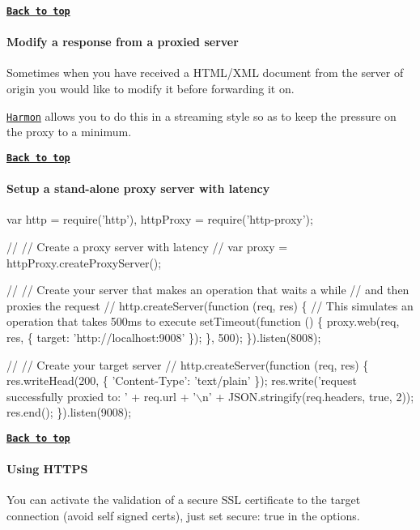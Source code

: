 {\bfseries \href{#table-of-contents}{\tt Back to top}}

\paragraph*{Modify a response from a proxied server}

Sometimes when you have received a H\+T\+M\+L/\+X\+ML document from the server of origin you would like to modify it before forwarding it on.

\href{https://github.com/No9/harmon}{\tt Harmon} allows you to do this in a streaming style so as to keep the pressure on the proxy to a minimum.

{\bfseries \href{#table-of-contents}{\tt Back to top}}

\paragraph*{Setup a stand-\/alone proxy server with latency}


\begin{DoxyCode}
var http = require('http'),
    httpProxy = require('http-proxy');

//
// Create a proxy server with latency
//
var proxy = httpProxy.createProxyServer();

//
// Create your server that makes an operation that waits a while
// and then proxies the request
//
http.createServer(function (req, res) \{
  // This simulates an operation that takes 500ms to execute
  setTimeout(function () \{
    proxy.web(req, res, \{
      target: 'http://localhost:9008'
    \});
  \}, 500);
\}).listen(8008);

//
// Create your target server
//
http.createServer(function (req, res) \{
  res.writeHead(200, \{ 'Content-Type': 'text/plain' \});
  res.write('request successfully proxied to: ' + req.url + '\(\backslash\)n' + JSON.stringify(req.headers, true, 2));
  res.end();
\}).listen(9008);
\end{DoxyCode}


{\bfseries \href{#table-of-contents}{\tt Back to top}}

\paragraph*{Using H\+T\+T\+PS}

You can activate the validation of a secure S\+SL certificate to the target connection (avoid self signed certs), just set {\ttfamily secure\+: true} in the options.

